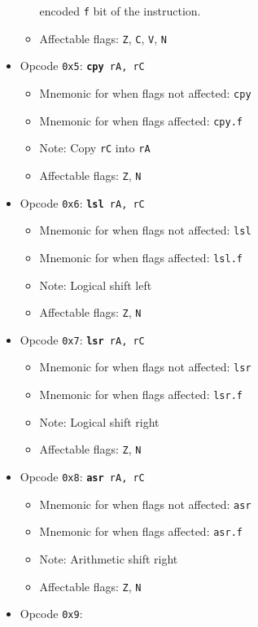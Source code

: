 \documentclass{article}
\begin{document}
\begin{itemize}
\begin{itemize}
			encoded \texttt{f} bit of the instruction.
			\item Affectable flags:
				\texttt{Z}, \texttt{C}, \texttt{V}, \texttt{N}
		\end{itemize}
		\item Opcode \texttt{0x5}:
			\texttt{\textbf{cpy} rA, rC}
		\begin{itemize}
			\item Mnemonic for when flags not affected:  \texttt{cpy}
			\item Mnemonic for when flags affected:  \texttt{cpy.f}
			\item Note:  Copy \texttt{rC} into \texttt{rA}
			\item Affectable flags:
				\texttt{Z}, \texttt{N}
		\end{itemize}
		\item Opcode \texttt{0x6}:
			\texttt{\textbf{lsl} rA, rC}
		\begin{itemize}
			\item Mnemonic for when flags not affected:  \texttt{lsl}
			\item Mnemonic for when flags affected:  \texttt{lsl.f}
			\item Note:  Logical shift left
			\item Affectable flags:
				\texttt{Z}, \texttt{N}
		\end{itemize}
		\item Opcode \texttt{0x7}:
			\texttt{\textbf{lsr} rA, rC}
		\begin{itemize}
			\item Mnemonic for when flags not affected:  \texttt{lsr}
			\item Mnemonic for when flags affected:  \texttt{lsr.f}
			\item Note:  Logical shift right
			\item Affectable flags:
				\texttt{Z}, \texttt{N}
		\end{itemize}
		\item Opcode \texttt{0x8}:
			\texttt{\textbf{asr} rA, rC}
		\begin{itemize}
			\item Mnemonic for when flags not affected:  \texttt{asr}
			\item Mnemonic for when flags affected:  \texttt{asr.f}
			\item Note:  Arithmetic shift right
			\item Affectable flags:
				\texttt{Z}, \texttt{N}
		\end{itemize}
		\item Opcode \texttt{0x9}:

\end{itemize}
\end{document}

